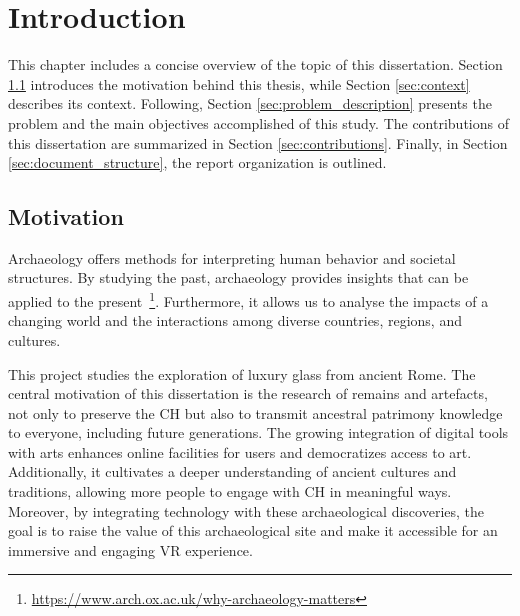 
%

\chapter{Introduction}
\label{cha:introduction}

This chapter includes a concise overview of the topic of this dissertation. 
Section \ref{sec:motivation} introduces the motivation behind this thesis, while Section \ref{sec:context} describes its context.
Following, Section \ref{sec:problem_description} presents the problem and the main objectives accomplished of this study. 
The contributions of this dissertation are summarized in Section \ref{sec:contributions}.
Finally, in Section \ref{sec:document_structure}, the report organization is outlined.

\section{Motivation}
\label{sec:motivation}
Archaeology offers methods for interpreting human behavior and societal structures. By studying the past, archaeology provides insights that can be applied to the present~\footnote{\url{https://www.arch.ox.ac.uk/why-archaeology-matters}}.
Furthermore, it allows us to analyse the impacts of a changing world and the interactions among diverse countries, regions, and cultures.

This project studies the exploration of luxury glass from ancient Rome.
The central motivation of this dissertation is the research of remains and artefacts, not
only to preserve the \gls{CH} but also to transmit ancestral patrimony knowledge to everyone, including future generations. 
The growing integration of digital tools with arts enhances online 
facilities for users and democratizes access to art. Additionally, it cultivates a deeper understanding of ancient cultures and traditions, allowing more people to engage with
\gls{CH} in meaningful ways. Moreover, by integrating technology with these archaeological 
discoveries, the goal is to raise the value of this archaeological site and make it accessible for an immersive and engaging \gls{VR} experience.


